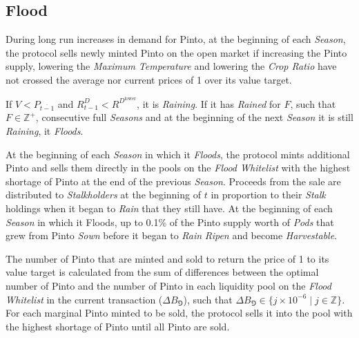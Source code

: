 \documentclass[tikz]{article}
\newcommand{\term}[1]{\textsl{#1}}
\newcommand{\Pinto}{} %
\begin{document}

\vspace{-0.15cm}
\subsection{Flood}
\vspace{-0.15cm}

During long run increases in demand for Pinto, at the beginning of each \term{Season}, the protocol sells newly minted Pinto on the open market if increasing the Pinto supply, lowering the \term{Maximum Temperature} and lowering the \term{Crop Ratio} have not crossed the average nor current prices of \Pinto1 over its value target.

\vspace{-0.05cm}

If $V < P_{\overline{t-1}}$ and $R_{t-1}^{D} < R^{D^{\text{lower}}}$, it is \term{Raining}. If it has \term{Rained} for $F$, such that $F \in \mathbb{Z}^{+}$, consecutive full \term{Seasons} and at the beginning of the next \term{Season} it is still \term{Raining}, it \term{Floods}. 

\vspace{-0.05cm}

At the beginning of each \term{Season} in which it \term{Floods}, the protocol mints additional Pinto and sells them directly in the pools on the \term{Flood Whitelist} with the highest shortage of Pinto at the end of the previous \term{Season}. Proceeds from the sale are distributed to \term{Stalkholders} at the beginning of $t$ in proportion to their \term{Stalk} holdings when it began to \term{Rain} that they still have. At the beginning of each \term{Season} in which it Floods, up to 0.1\% of the Pinto supply worth of \term{Pods} that grew from Pinto \term{Sown} before it began to \term{Rain} \term{Ripen} and become \term{Harvestable}.

\vspace{-0.05cm}

The number of Pinto that are minted and sold to return the price of \Pinto1 to its value target is calculated from the sum of differences between the optimal number of Pinto and the number of Pinto in each liquidity pool on the \term{Flood Whitelist} in the current transaction ($\Delta B_{\Game}$), such that $\Delta B_{\Game} \in \{j \times 10^{-6} \mid j \in \mathbb{Z} \}$. For each marginal Pinto minted to be sold, the protocol sells it into the pool with the highest shortage of Pinto until all Pinto are sold.
\end{document}
